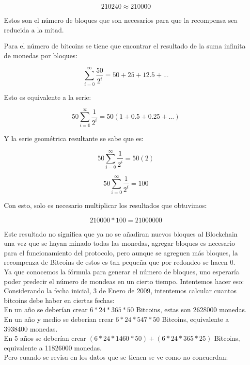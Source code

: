 \documentclass[12pt,letterpaper]{article}
\begin{document}
    $$210240 \approx 210000$$

    Estos son el n\'umero de bloques que son necesarios para que la recompensa sea reducida a la mitad.

    Para el n\'umero de bitcoins se tiene que encontrar el resultado de la suma infinita de monedas por bloques:
    
    $$ \sum_{i = 0}^{\infty} \frac{50}{2^{i}} = 50 + 25 + 12.5 + ...$$

    Esto es equivalente a la serie:

    $$ 50 \sum_{i = 0}^{\infty} \frac{1}{2^{i}} = 50 (1 + 0.5 + 0.25 + ...) $$

    Y la serie geom\'etrica resultante se sabe que es:

    $$ 50 \sum_{i = 0}^{\infty} \frac{1}{2^{i}} = 50 (2) $$

    $$ 50 \sum_{i = 0}^{\infty} \frac{1}{2^{i}} = 100 $$

    Con esto, solo es necesario multiplicar los resultados que obtuvimos:

    $$ 210000 * 100 = 21000000 $$

    Este resultado no significa que ya no se a\~nadiran nuevos bloques al Blockchain una vez que se hayan minado todas las monedas, agregar bloques es necesario para el funcionamiento del protocolo, pero aunque se agreguen m\'as bloques, la recompenza de Bitcoins de estos es tan peque\~na que por redondeo se hacen 0.
    \\

    Ya que conocemos la f\'ormula para generar el n\'umero de bloques, uno esperar\'ia poder predecir el n\'umero de mondeas en un cierto tiempo. Intentemos hacer eso:
    \\
    Considerando la fecha inicial, 3 de Enero de 2009, intentemos calcular cuantos bitcoins debe haber en ciertas fechas:
    \\
    En un a\~no se deber\'ian crear $6 * 24 * 365 * 50$ Bitcoins, estas son 2628000 monedas.
    \\
    En un a\~no y medio se deber\'ian crear $6 * 24 * 547 * 50$ Bitcoins, equivalente a 3938400 monedas.
    \\
    En 5 a\~nos se deber\'ian crear $(6 * 24 * 1460 * 50) + (6 * 24 * 365 * 25)$ Bitcoins, equivalente a 11826000 monedas.
    \\
    Pero cuando se revisa en los datos que se tienen se ve como no concuerdan:
\end{document}
